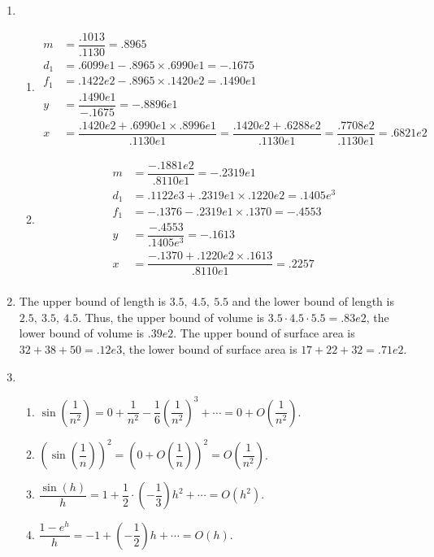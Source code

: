 \documentclass[12pt]{article}
\begin{document}
\begin{enumerate}
    \item \begin{enumerate}
        \item \begin{align*}
            m &= \dfrac{.1013}{.1130} = .8965\\
            d_1 &= .6099e1 - .8965\times .6990e1 = -.1675\\
            f_1 &= .1422e2 - .8965 \times .1420e2 = .1490e1\\
            y &= \dfrac{.1490e1}{-.1675} = -.8896e1\\
            x &= \dfrac{.1420e2 + .6990e1 \times .8996e1}{.1130e1} = \dfrac{.1420e2 + .6288e2}{.1130e1} = \dfrac{.7708e2}{.1130e1} = .6821e2
        \end{align*}

        \item \begin{align*}
            m &= \dfrac{-.1881e2}{.8110e1} = -.2319e1\\
            d_1 &= .1122e3 + .2319e1 \times .1220e2 = .1405e^3\\
            f_1 &= -.1376 - .2319e1 \times .1370 = -.4553\\
            y &= \dfrac{-.4553}{.1405e^3} = -.1613\\
            x &= \dfrac{-.1370 + .1220e2 \times .1613}{.8110e1} = .2257\\
        \end{align*}
    \end{enumerate}

    \item The upper bound of length is $3.5,\ 4.5,\ 5.5$ and the lower bound of length is $2.5,\ 3.5,\ 4.5$.
    Thus, the upper bound of volume is $3.5 \cdot 4.5 \cdot 5.5 = .83e2$, the lower bound of volume is $.39e2$.
    The upper bound of surface area is $32 + 38 + 50 = .12e3$, the lower bound of surface area is $17 + 22 + 32 = .71e2$.

    \item \begin{enumerate}
        \item $\sin\left(\dfrac{1}{n^2}\right) = 0 + \dfrac{1}{n^2} - \dfrac{1}{6}\left(\dfrac{1}{n^2}\right)^3 + \cdots = 0 + O\left(\dfrac{1}{n^2}\right)$.

        \item $(\sin\left(\dfrac{1}{n}\right))^2 = (0 + O\left(\dfrac{1}{n}\right))^2 = O\left(\dfrac{1}{n^2}\right)$.
        
        \item $\dfrac{\sin(h)}{h} = 1 +  \dfrac{1}{2}\cdot (-\dfrac{1}{3}) h^2 + \cdots = O(h^2)$.
        
        \item $\dfrac{1-e^h}{h} = -1 + (-\dfrac{1}{2})h + \cdots = O(h)$.
    \end{enumerate}
\end{enumerate}
\end{document}

